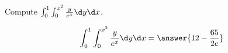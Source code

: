 \documentclass{ximera}
\author{David Guichard \and Neal Koblitz \and H. Jerome Keisler \and Albert Scheller \and Barry Balof \and Mike Wills \and Matthew Carr}
\begin{document}
\begin{exercise}




Compute $\int_{0}^{1}\int_{0}^{x^2}\frac{y}{e^x} \d y\d x$.
\begin{prompt}
\[
\int_{0}^{1}\int_{0}^{x^2}\frac{y}{e^x} \d y\d x=\answer{12-\frac{65}{2e}}
\]
\end{prompt}



\end{exercise}
\end{document}
